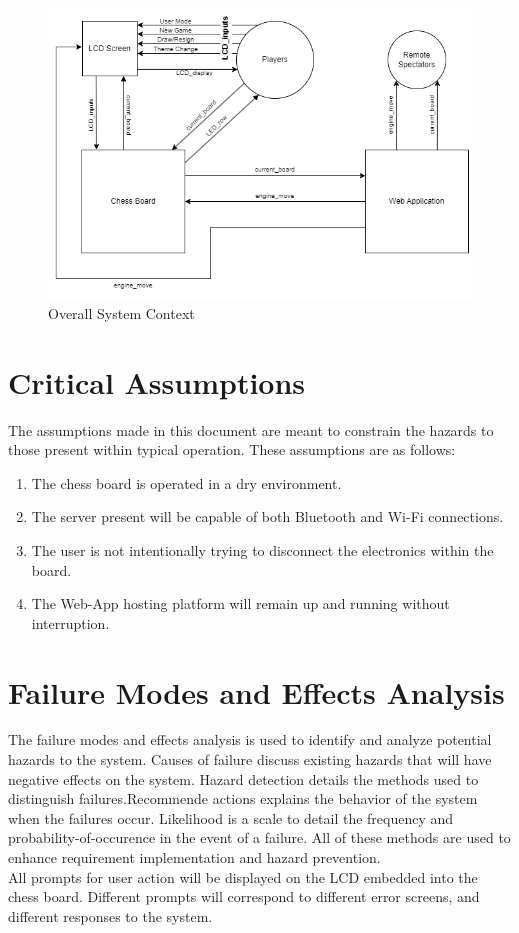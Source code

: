 \documentclass{article}
\begin{document}
{    \begin{figure}[H]
        \begin{center}
          \includegraphics[scale=0.65]{chess-connect-system-context.png}
          \caption{Overall System Context}
          \label{Fig_SystemContext} 
        \end{center}
      \end{figure}
}

\section{Critical Assumptions}

The assumptions made in this document are meant to constrain the hazards to those present within typical operation. These assumptions are as follows:
\begin{enumerate}
    \item The chess board is operated in a dry environment.
    \item The server present will be capable of both Bluetooth and Wi-Fi connections.
    \item The user is not intentionally trying to disconnect the electronics within the board.
    \item The Web-App hosting platform will remain up and running without interruption.
\end{enumerate}

\section{Failure Modes and Effects Analysis}
{The failure modes and effects analysis is used to identify and analyze potential 
hazards to the system. Causes of failure discuss existing hazards that will have
negative effects on the system. Hazard detection details the methods used to distinguish
failures.Recommende actions explains the behavior of the system when the failures
occur. Likelihood is a scale to detail the frequency and probability-of-occurence
in the event of a failure. All of these methods are used to enhance requirement 
implementation and hazard prevention. \\

All prompts for user action will be displayed on the LCD embedded into the chess board.
Different prompts will correspond to different error screens, and different responses to the system.} 
\end{document}
